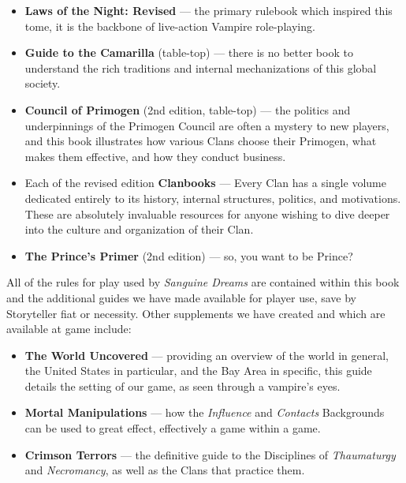 \begin{itemize}
	\item \textbf{Laws of the Night: Revised} --- the primary rulebook which inspired this 
	tome, it is the backbone of live-action Vampire role-playing.
	\item \textbf{Guide to the Camarilla} (table-top) --- there is no better book to understand 
	the rich traditions and internal mechanizations of this global society.
	\item \textbf{Council of Primogen} (2nd edition, table-top) --- the politics and underpinnings 
	of the Primogen Council are often a mystery to new players, and this book illustrates how various 
	Clans choose their Primogen, what makes them effective, and how they conduct business.
	\item Each of the revised edition \textbf{Clanbooks} --- Every Clan has a single volume dedicated 
	entirely to its history, internal structures, politics, and motivations.  These are absolutely 
	invaluable resources for anyone wishing to dive deeper into the culture and organization of their 
	Clan.
	\item \textbf{The Prince's Primer} (2nd edition) --- so, you want to be Prince? \\
\end{itemize}

\noindent All of the rules for play used by \emph{Sanguine Dreams} are contained within this book 
and the additional guides we have made available for player use, save by Storyteller fiat or necessity.  
Other supplements we have created and which are available at game include:

\begin{itemize}
	\item \textbf{The World Uncovered} --- providing an overview of the world in general, the 
	United States in particular, and the Bay Area in specific, this guide details the setting of our 
	game, as seen through a vampire's eyes.
	\item \textbf{Mortal Manipulations} --- how the \emph{Influence} and \emph{Contacts} Backgrounds can 
	be used to great effect, effectively a game within a game.
	\item \textbf{Crimson Terrors} --- the definitive guide to the Disciplines of \emph{Thaumaturgy} 
	and \emph{Necromancy}, as well as the Clans that practice them.
\end{itemize}

